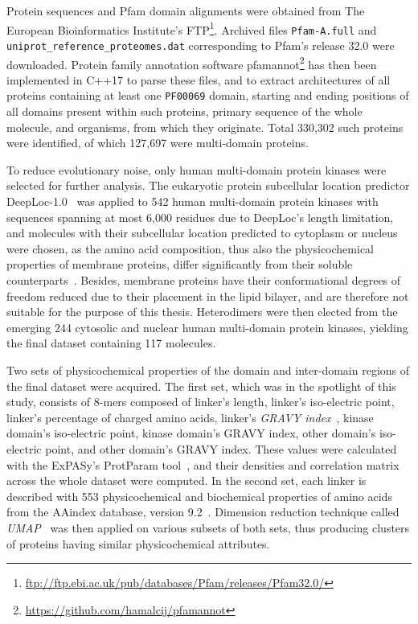\label{methods}

Protein sequences and Pfam domain alignments were obtained from The European
Bioinformatics Institute's
FTP\footnote{\url{ftp://ftp.ebi.ac.uk/pub/databases/Pfam/releases/Pfam32.0/}}.
Archived files \texttt{Pfam-A.full} and \texttt{uniprot\_reference\_proteomes.dat}
corresponding to Pfam's release 32.0 were downloaded.
Protein family annotation software
pfamannot\footnote{\url{https://github.com/hamalcij/pfamannot}} has then been implemented
in C++17 to parse these files, and to extract architectures of all proteins containing at
least one \texttt{PF00069} domain, starting and ending positions of all domains present
within such proteins, primary sequence of the whole molecule, and organisms, from which
they originate.
Total 330,302 such proteins were identified, of which 127,697 were multi-domain proteins.

To reduce evolutionary noise, only human multi-domain protein kinases were selected for
further analysis.
The eukaryotic protein subcellular location predictor
DeepLoc-1.0~\cite{almagro2017deeploc} was applied to 542 human multi-domain protein
kinases with sequences spanning at most 6,000 residues due to DeepLoc's length limitation,
and molecules with their subcellular location predicted to cytoplasm or nucleus were
chosen, as the amino acid composition, thus also the physicochemical properties of
membrane proteins, differ significantly from their soluble
counterparts~\cite{capaldi1972low, von1988topogenic, tusnady1998principles}.
Besides, membrane proteins have their conformational degrees of freedom reduced due to
their placement in the lipid bilayer, and are therefore not suitable for the purpose of
this thesis.
Heterodimers were then elected from the emerging 244 cytosolic and nuclear human
multi-domain protein kinases, yielding the final dataset containing 117 molecules.

Two sets of physicochemical properties of the domain and inter-domain regions of the final
dataset were acquired.
The first set, which was in the spotlight of this study, consists of 8-mers composed of
linker's length, linker's iso-electric point, linker's percentage of charged amino acids,
linker's \emph{GRAVY index}~\cite{kyte1982simple}, kinase domain's iso-electric point,
kinase domain's GRAVY index, other domain's iso-electric point, and other domain's GRAVY
index.
These values were calculated with the ExPASy's ProtParam tool~\cite{gasteiger2005protein},
and their densities and correlation matrix across the whole dataset were computed.
In the second set, each linker is described with 553 physicochemical and
biochemical properties of amino acids from the AAindex database, version
9.2~\cite{nakai1988cluster, tomii1996analysis, kawashima1999aaindex, kawashima2000aaindex,
kawashima2007aaindex}.
Dimension reduction technique called \emph{UMAP}~\cite{mcinnes2018umap} was then applied
on various subsets of both sets, thus producing clusters of proteins having similar
physicochemical attributes.

